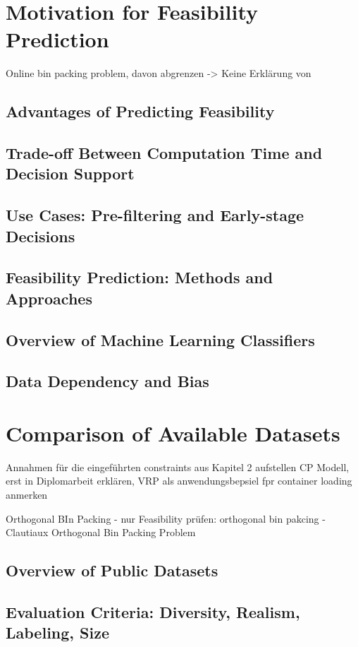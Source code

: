 

\chapter{Motivation for Feasibility Prediction}
Online bin packing problem, davon abgrenzen -> Keine Erklärung von
\section{Advantages of Predicting Feasibility}
\section{Trade-off Between Computation Time and Decision Support}
\section{Use Cases: Pre-filtering and Early-stage Decisions}
\section{Feasibility Prediction: Methods and Approaches}
\section{Overview of Machine Learning Classifiers}
\section{Data Dependency and Bias}

\chapter{Comparison of Available Datasets}
Annahmen für die eingeführten constraints aus Kapitel 2 aufstellen
CP Modell, erst in Diplomarbeit erklären,
VRP als anwendungsbepsiel fpr container loading anmerken

Orthogonal BIn Packing - nur Feasibility prüfen:
orthogonal bin pakcing - Clautiaux Orthogonal Bin Packing Problem


\section{Overview of Public Datasets}
\section{Evaluation Criteria: Diversity, Realism, Labeling, Size}

